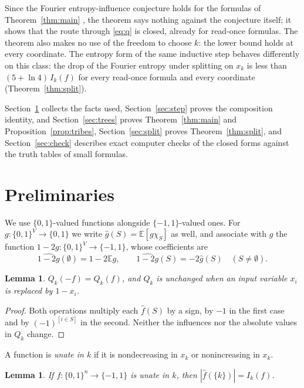 \documentclass[11pt]{amsart}
\newtheorem{lemma}[theorem]{Lemma}
\theoremstyle{definition}\newtheorem{definition}[theorem]{Definition}
\theoremstyle{remark}\newtheorem{remark}[theorem]{Remark}
\newcommand{\E}{\mathbb{E}}
\newcommand{\hf}{\widehat{f}}
\begin{document}
Since the Fourier entropy-influence conjecture holds for the formulas of Theorem~\ref{thm:main} \cite{ot}, the theorem
says nothing against the conjecture itself; it shows that the route through \eqref{eq:q} is closed, already for
read-once formulas. The theorem also makes no use of the freedom to choose $k$: the lower bound holds at every
coordinate. The entropy form of the same inductive step behaves differently on this class: the drop of the Fourier
entropy under splitting on $x_k$ is less than $(5+\ln4)\,I_k(f)$ for every read-once formula and every coordinate
(Theorem~\ref{thm:split}).

Section~\ref{sec:prelim} collects the facts used, Section~\ref{sec:step} proves the composition identity, and
Section~\ref{sec:trees} proves Theorem~\ref{thm:main} and Proposition~\ref{prop:tribes}, Section~\ref{sec:split}
proves Theorem~\ref{thm:split}, and Section~\ref{sec:check} describes exact computer checks of the closed forms
against the truth tables of small formulas.

\section{Preliminaries}\label{sec:prelim}

We use $\{0,1\}$-valued functions alongside $\{-1,1\}$-valued ones. For $g\colon\{0,1\}^V\to\{0,1\}$ we write
$\widehat g(S)=\E[g\chi_S]$ as well, and associate with $g$ the function $1-2g\colon\{0,1\}^V\to\{-1,1\}$, whose
coefficients are
\begin{equation}\label{eq:pm}
\widehat{1-2g}(\emptyset)=1-2\E g,\qquad \widehat{1-2g}(S)=-2\widehat g(S)\quad(S\ne\emptyset).
\end{equation}

\begin{lemma}\label{lem:inv}
$Q_k(-f)=Q_k(f)$, and $Q_k$ is unchanged when an input variable $x_i$ is replaced by $1-x_i$.
\end{lemma}

\begin{proof}
Both operations multiply each $\hf(S)$ by a sign, by $-1$ in the first case and by $(-1)^{[i\in S]}$ in the second.
Neither the influences nor the absolute values in $Q_k$ change.
\end{proof}

A function is \emph{unate in $k$} if it is nondecreasing in $x_k$ or nonincreasing in $x_k$.

\begin{lemma}\label{lem:unate}
If $f\colon\{0,1\}^n\to\{-1,1\}$ is unate in $k$, then $|\hf(\{k\})|=I_k(f)$.
\end{lemma}
\end{document}
